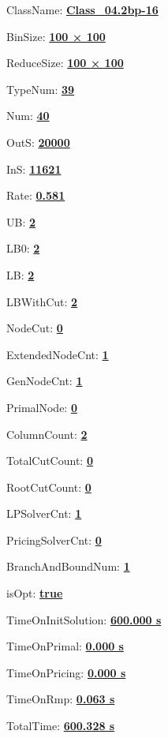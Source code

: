 \documentclass[11pt]{article}
\begin{document}
\pagestyle{empty}


ClassName: \underline{\textbf{Class_04.2bp-16}}
\par
BinSize: \underline{\textbf{100 × 100}}
\par
ReduceSize: \underline{\textbf{100 × 100}}
\par
TypeNum: \underline{\textbf{39}}
\par
Num: \underline{\textbf{40}}
\par
OutS: \underline{\textbf{20000}}
\par
InS: \underline{\textbf{11621}}
\par
Rate: \underline{\textbf{0.581}}
\par
UB: \underline{\textbf{2}}
\par
LB0: \underline{\textbf{2}}
\par
LB: \underline{\textbf{2}}
\par
LBWithCut: \underline{\textbf{2}}
\par
NodeCut: \underline{\textbf{0}}
\par
ExtendedNodeCnt: \underline{\textbf{1}}
\par
GenNodeCnt: \underline{\textbf{1}}
\par
PrimalNode: \underline{\textbf{0}}
\par
ColumnCount: \underline{\textbf{2}}
\par
TotalCutCount: \underline{\textbf{0}}
\par
RootCutCount: \underline{\textbf{0}}
\par
LPSolverCnt: \underline{\textbf{1}}
\par
PricingSolverCnt: \underline{\textbf{0}}
\par
BranchAndBoundNum: \underline{\textbf{1}}
\par
isOpt: \underline{\textbf{true}}
\par
TimeOnInitSolution: \underline{\textbf{600.000 s}}
\par
TimeOnPrimal: \underline{\textbf{0.000 s}}
\par
TimeOnPricing: \underline{\textbf{0.000 s}}
\par
TimeOnRmp: \underline{\textbf{0.063 s}}
\par
TotalTime: \underline{\textbf{600.328 s}}
\par
\newpage
\end{document}
